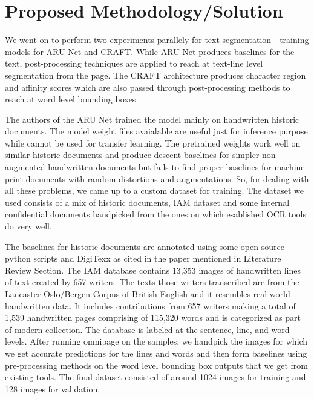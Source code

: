 %


{\let\clearpage\relax \chapter{Proposed Methodology/Solution}}

We went on to perform two experiments parallely for text segmentation - training models for ARU Net and CRAFT. While ARU Net produces baselines for the text, post-processing techniques are applied to reach at text-line level segmentation from the page\cite{3}. The CRAFT architecture produces character region and affinity scores which are also passed through post-processing methods to reach at word level bounding boxes.\cite{5}

The authors of the ARU Net trained the model mainly on handwritten historic documents. The model weight files avaialable are useful just for inference purpose while cannot be used for transfer learning. The pretrained weights work well on similar historic documents and produce descent baselines for simpler non-augmented handwritten documents but fails to find proper baselines for machine print documents with random distortions and augmentations. So, for dealing with all these problems, we came up to a custom dataset for training. The dataset we used consists of a mix of historic documents, IAM dataset and some internal confidential documents handpicked from the ones on which esablished OCR tools do very well.

The baselines for historic documents are annotated using some open source python scripts and DigiTexx as cited in the paper mentioned in Literature Review Section\cite{6}. The IAM database contains 13,353 images of handwritten lines of text created by 657 writers. The texts those writers transcribed are from the Lancaster-Oslo/Bergen Corpus of British English and it resembles real world handwritten data. It includes contributions from 657 writers making a total of 1,539 handwritten pages comprising of 115,320 words and is categorized as part of modern collection. The database is labeled at the sentence, line, and word levels. After running omnipage on the samples, we handpick the images for which we get accurate predictions for the lines and words and then form baselines using pre-processing methods on the word level bounding box outputs that we get from existing tools. The final dataset consisted of around 1024 images for training and 128 images for validation.

